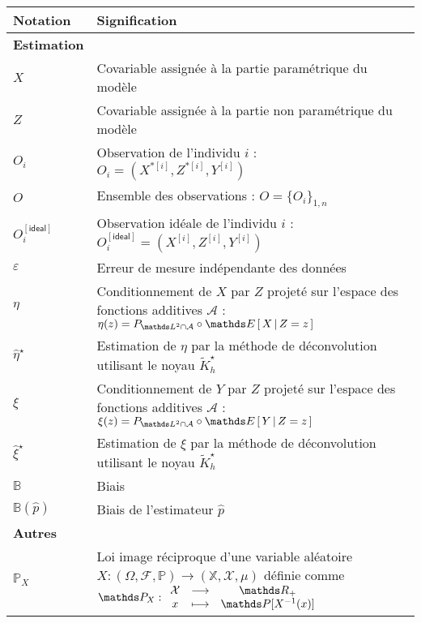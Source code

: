 \begin{tabularx}{\linewidth}{lX}
	\toprule
	\textbf{Notation} & \textbf{Signification}                                                                                                                                                                                   \\
	\midrule
	\textbf{Estimation} & \\
	\midrule

	$X$ & Covariable assignée à la partie paramétrique du modèle \\
	$Z$ & Covariable assignée à la partie non paramétrique du modèle \\
	\midrule
	$O_i$ & Observation de l'individu $i$ : $O_i = (X^{*[i]}, Z^{*[i]}, Y^{[i]})$ \\
	$O$ & Ensemble des observations : $O = \{O_i\}_{1,n}$ \\
	$O_i^{[\textsf{ideal}]}$ & Observation idéale de l'individu $i$ : $O_i^{[\textsf{ideal}]} = (X^{[i]}, Z^{[i]}, Y^{[i]})$ \\
	\midrule
	$\varepsilon$ & Erreur de mesure indépendante des données \\
	\midrule
	$\eta$ & Conditionnement de $X$ par $Z$ projeté sur l'espace des fonctions additives $\mathcal A$ : \linebreak $\eta(z) = P_{\mathds L^2 \cap \mathcal A} \circ \esperancesachant {Z=z} {X}$\\
	$\widehat \eta^\star$ & Estimation de $\eta$ par la méthode de déconvolution utilisant le noyau $\tilde K_h^\star$ \\
	\midrule
	$\xi$ & Conditionnement de $Y$ par $Z$ projeté sur l'espace des fonctions additives $\mathcal A$ : \linebreak $\xi(z) = P_{\mathds L^2 \cap \mathcal A} \circ \esperancesachant {Z=z} {Y}$\\
	$\widehat \xi^\star$ & Estimation de $\xi$ par la méthode de déconvolution utilisant le noyau $\tilde K_h^\star$ \\
	\midrule
	$\mathds B$ & Biais  \hspace{9cm}{contexte : estimation dans $\grandR$}\\
	$\mathds B(\widehat p)$ & Biais de l'estimateur $\widehat p$ \hspace{5.8cm}{contexte : estimation dans $\grandR$}\\
	\midrule
	\textbf{Autres} & \\
	\midrule

	$\mathds P_X$ & Loi image réciproque d'une variable aléatoire $X : (\Omega, \mathcal F , \mathds P) \rightarrow (\mathds X, \mathcal X, \mu)$ définie comme $\mathds P_X :\func {\mathcal X}{\Rplus} {x}  {\mathds P[ \inverse X(x)]}$ \\

	\bottomrule
\end{tabularx}
